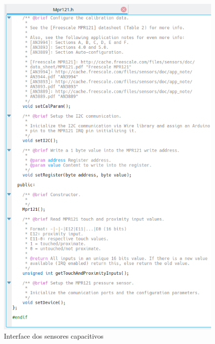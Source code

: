    \begin{figure}[htbp]
    \centering
    \includegraphics[scale=0.8,keepaspectratio=true]{./imagenes/interface-sensores-capacitivos.png}
    \caption{Interface dos sensores capacitivos}
    \label{figura:InterfaceSensoresCapacitivos}
   \end{figure}
   
